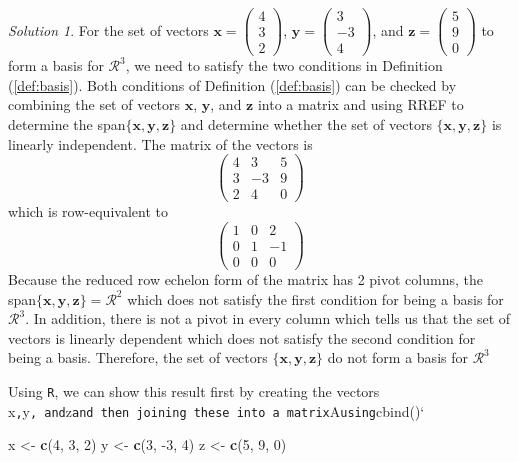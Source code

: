 \documentclass[
]{book}
\newenvironment{Shaded}{\begin{snugshade}}{\end{snugshade}}
\newcommand{\DecValTok}[1]{\textcolor[rgb]{0.00,0.00,0.81}{#1}}
\newcommand{\KeywordTok}[1]{\textcolor[rgb]{0.13,0.29,0.53}{\textbf{#1}}}
\newcommand{\NormalTok}[1]{#1}
\newcommand{\StringTok}[1]{\textcolor[rgb]{0.31,0.60,0.02}{#1}}
\theoremstyle{definition}
\theoremstyle{definition}
\theoremstyle{definition}
\theoremstyle{remark}
\newtheorem*{solution}{Solution}
\begin{document}
\begin{solution}

For the set of vectors \(\mathbf{x} = \begin{pmatrix} 4 \\ 3 \\ 2 \end{pmatrix}\), \(\mathbf{y} = \begin{pmatrix} 3 \\ -3 \\ 4 \end{pmatrix}\), and \(\mathbf{z} = \begin{pmatrix} 5 \\ 9 \\ 0 \end{pmatrix}\) to form a basis for \(\mathcal{R}^3\), we need to satisfy the two conditions in Definition (\ref{def:basis}). Both conditions of Definition (\ref{def:basis}) can be checked by combining the set of vectors \(\mathbf{x}\), \(\mathbf{y}\), and \(\mathbf{z}\) into a matrix and using RREF to determine the span\(\{ \mathbf{x}, \mathbf{y}, \mathbf{z} \}\) and determine whether the set of vectors \(\{ \mathbf{x}, \mathbf{y}, \mathbf{z} \}\) is linearly independent. The matrix of the vectors is
\[
\begin{pmatrix} 4 & 3 & 5 \\ 3 & -3 & 9 \\ 2 & 4 & 0 \end{pmatrix}
\]
which is row-equivalent to
\[
\begin{pmatrix} 1 & 0 & 2 \\ 0 & 1 & -1 \\ 0 & 0 & 0 \end{pmatrix}
\]
Because the reduced row echelon form of the matrix has 2 pivot columns, the span\(\{ \mathbf{x}, \mathbf{y}, \mathbf{z} \} = \mathcal{R}^2\) which does not satisfy the first condition for being a basis for \(\mathcal{R}^3\). In addition, there is not a pivot in every column which tells us that the set of vectors is linearly dependent which does not satisfy the second condition for being a basis. Therefore, the set of vectors \(\{ \mathbf{x}, \mathbf{y}, \mathbf{z} \}\) do not form a basis for \(\mathcal{R}^3\)

Using \texttt{R}, we can show this result first by creating the vectors x\texttt{,}y\texttt{,\ and}z\texttt{and\ then\ joining\ these\ into\ a\ matrix}A\texttt{using}cbind()`

\begin{Shaded}
\begin{Highlighting}[]
\NormalTok{x <-}\StringTok{ }\KeywordTok{c}\NormalTok{(}\DecValTok{4}\NormalTok{, }\DecValTok{3}\NormalTok{, }\DecValTok{2}\NormalTok{)}
\NormalTok{y <-}\StringTok{ }\KeywordTok{c}\NormalTok{(}\DecValTok{3}\NormalTok{, }\DecValTok{-3}\NormalTok{, }\DecValTok{4}\NormalTok{)}
\NormalTok{z <-}\StringTok{ }\KeywordTok{c}\NormalTok{(}\DecValTok{5}\NormalTok{, }\DecValTok{9}\NormalTok{, }\DecValTok{0}\NormalTok{)}


\end{Highlighting}
\end{Shaded}
\end{solution}
\end{document}
